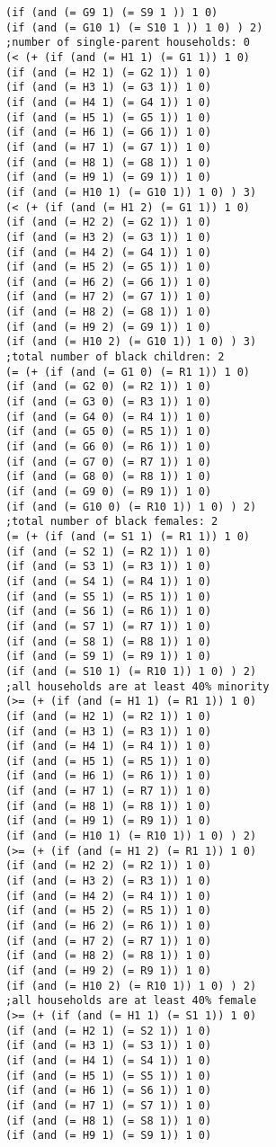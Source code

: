 \documentclass[5p,times,11pt]{elsarticle}
\begin{document}
\begin{verbatim}
(if (and (= G9 1) (= S9 1 )) 1 0)
(if (and (= G10 1) (= S10 1 )) 1 0) ) 2)
;number of single-parent households: 0
(< (+ (if (and (= H1 1) (= G1 1)) 1 0)
(if (and (= H2 1) (= G2 1)) 1 0)
(if (and (= H3 1) (= G3 1)) 1 0)
(if (and (= H4 1) (= G4 1)) 1 0)
(if (and (= H5 1) (= G5 1)) 1 0)
(if (and (= H6 1) (= G6 1)) 1 0)
(if (and (= H7 1) (= G7 1)) 1 0)
(if (and (= H8 1) (= G8 1)) 1 0)
(if (and (= H9 1) (= G9 1)) 1 0)
(if (and (= H10 1) (= G10 1)) 1 0) ) 3)
(< (+ (if (and (= H1 2) (= G1 1)) 1 0)
(if (and (= H2 2) (= G2 1)) 1 0)
(if (and (= H3 2) (= G3 1)) 1 0)
(if (and (= H4 2) (= G4 1)) 1 0)
(if (and (= H5 2) (= G5 1)) 1 0)
(if (and (= H6 2) (= G6 1)) 1 0)
(if (and (= H7 2) (= G7 1)) 1 0)
(if (and (= H8 2) (= G8 1)) 1 0)
(if (and (= H9 2) (= G9 1)) 1 0)
(if (and (= H10 2) (= G10 1)) 1 0) ) 3)
;total number of black children: 2
(= (+ (if (and (= G1 0) (= R1 1)) 1 0)
(if (and (= G2 0) (= R2 1)) 1 0)
(if (and (= G3 0) (= R3 1)) 1 0)
(if (and (= G4 0) (= R4 1)) 1 0)
(if (and (= G5 0) (= R5 1)) 1 0)
(if (and (= G6 0) (= R6 1)) 1 0)
(if (and (= G7 0) (= R7 1)) 1 0)
(if (and (= G8 0) (= R8 1)) 1 0)
(if (and (= G9 0) (= R9 1)) 1 0)
(if (and (= G10 0) (= R10 1)) 1 0) ) 2)
;total number of black females: 2
(= (+ (if (and (= S1 1) (= R1 1)) 1 0)
(if (and (= S2 1) (= R2 1)) 1 0)
(if (and (= S3 1) (= R3 1)) 1 0)
(if (and (= S4 1) (= R4 1)) 1 0)
(if (and (= S5 1) (= R5 1)) 1 0)
(if (and (= S6 1) (= R6 1)) 1 0)
(if (and (= S7 1) (= R7 1)) 1 0)
(if (and (= S8 1) (= R8 1)) 1 0)
(if (and (= S9 1) (= R9 1)) 1 0)
(if (and (= S10 1) (= R10 1)) 1 0) ) 2)
;all households are at least 40% minority
(>= (+ (if (and (= H1 1) (= R1 1)) 1 0)
(if (and (= H2 1) (= R2 1)) 1 0)
(if (and (= H3 1) (= R3 1)) 1 0)
(if (and (= H4 1) (= R4 1)) 1 0)
(if (and (= H5 1) (= R5 1)) 1 0)
(if (and (= H6 1) (= R6 1)) 1 0)
(if (and (= H7 1) (= R7 1)) 1 0)
(if (and (= H8 1) (= R8 1)) 1 0)
(if (and (= H9 1) (= R9 1)) 1 0)
(if (and (= H10 1) (= R10 1)) 1 0) ) 2)
(>= (+ (if (and (= H1 2) (= R1 1)) 1 0)
(if (and (= H2 2) (= R2 1)) 1 0)
(if (and (= H3 2) (= R3 1)) 1 0)
(if (and (= H4 2) (= R4 1)) 1 0)
(if (and (= H5 2) (= R5 1)) 1 0)
(if (and (= H6 2) (= R6 1)) 1 0)
(if (and (= H7 2) (= R7 1)) 1 0)
(if (and (= H8 2) (= R8 1)) 1 0)
(if (and (= H9 2) (= R9 1)) 1 0)
(if (and (= H10 2) (= R10 1)) 1 0) ) 2)
;all households are at least 40% female
(>= (+ (if (and (= H1 1) (= S1 1)) 1 0)
(if (and (= H2 1) (= S2 1)) 1 0)
(if (and (= H3 1) (= S3 1)) 1 0)
(if (and (= H4 1) (= S4 1)) 1 0)
(if (and (= H5 1) (= S5 1)) 1 0)
(if (and (= H6 1) (= S6 1)) 1 0)
(if (and (= H7 1) (= S7 1)) 1 0)
(if (and (= H8 1) (= S8 1)) 1 0)
(if (and (= H9 1) (= S9 1)) 1 0)

\end{verbatim}
\end{document}
